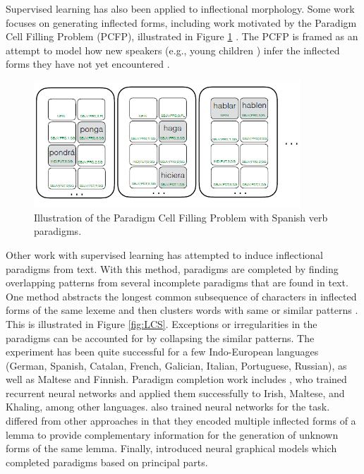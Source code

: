 Supervised learning has also been applied to inflectional morphology. Some work focuses on generating inflected forms, including work motivated by the Paradigm Cell Filling Problem (PCFP), illustrated in Figure \ref{fig:PCFP} \citep{ackerman2009}. The PCFP is framed as an attempt to model how new speakers (e.g., young children
) infer the inflected forms they have not yet encountered \citep{dreyer_discovering_2011,ahlberg_paradigm_2015,malouf_generating_2016,silfverberg_encoder-decoder_2018}. 


\begin{figure}[tb]
\begin{center}
\includegraphics[width=10cm]{figs/PCFP.PNG}
\caption[Paradigm Cell Filling Problem]{Illustration of the Paradigm Cell Filling Problem \citep{silfverberg_encoder-decoder_2018} with Spanish verb paradigms.}
\label{fig:PCFP}
\end{center}
\end{figure}


Other work with supervised learning has attempted to induce inflectional paradigms from text. With this method, paradigms are completed by finding overlapping patterns from several incomplete paradigms that are found in text. One method abstracts the longest common subsequence of characters in inflected forms of the same lexeme and then clusters words with same or similar patterns \citep{ahlberg_semi-supervised_2014,ahlberg_paradigm_2015}. This is illustrated in Figure \ref{fig:LCS}. Exceptions or irregularities in the paradigms can be accounted for by collapsing the similar patterns. The experiment has been quite successful for a few Indo-European languages (German, Spanish, Catalan, French, Galician, Italian, Portuguese, Russian), as well as Maltese and Finnish. Paradigm completion work includes \citet{malouf_generating_2016}, who trained recurrent neural networks and applied them successfully to Irish, Maltese, and Khaling, among other languages.
\citet{silfverberg_encoder-decoder_2018} also trained neural networks for the task.  \citet{kann-etal-2017-neural} differed from other approaches in that they encoded multiple inflected forms of a lemma to provide complementary information for the generation of unknown forms of the same lemma.
Finally, \citet{cotterell-etal-2017-neural} introduced neural graphical models which completed paradigms based on principal parts.

